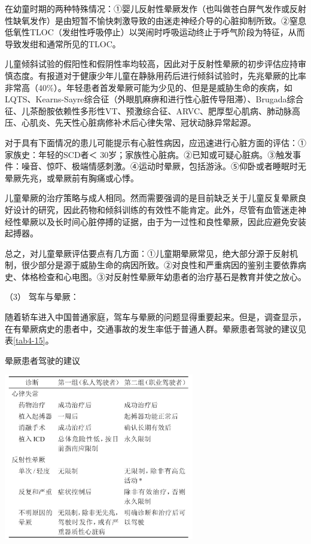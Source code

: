 在幼童时期的两种特殊情况：①婴儿反射性晕厥发作（也叫做苍白屏气发作或反射性缺氧发作）是由短暂不愉快刺激导致的由迷走神经介导的心脏抑制所致。②窒息低氧性TLOC（发绀性呼吸停止）以哭闹时呼吸运动终止于呼气阶段为特征，从而导致发绀和通常所见的TLOC。

儿童倾斜试验的假阳性和假阴性率均较高，因此对于反射性晕厥的初步评估应持审慎态度。有报道对于健康少年儿童在静脉用药后进行倾斜试验时，先兆晕厥的比率非常高（40\%）。年轻患者首发晕厥可能为少见的、但是是威胁生命的疾病，如LQTS、Kearns-Sayre综合征（外眼肌麻痹和进行性心脏传导阻滞）、Brugada综合征、儿茶酚胺依赖性多形性VT、预激综合征、ARVC、肥厚型心肌病、肺动脉高压、心肌炎、先天性心脏病修补术后心律失常、冠状动脉异常起源。

对于具有下面情况的患儿可能提示有心脏性病因，应迅速进行心脏方面的评估：①家族史：年轻的SCD者＜
30岁；家族性心脏病。②已知或可疑心脏病。③触发事件：噪音、惊吓、极端情感刺激。④运动时晕厥，包括游泳。⑤仰卧或者睡眠时无晕厥先兆，或晕厥前有胸痛或心悸。

儿童晕厥的治疗策略与成人相同。然而需要强调的是目前缺乏关于儿童反复晕厥良好设计的研究，因此药物和倾斜训练的有效性不能肯定。此外，尽管有血管迷走神经性晕厥以及长时间心脏停搏的证据，由于为一过性和良性晕厥，因此应避免安装起搏器。

总之，对儿童晕厥评估要点有几方面：①儿童期晕厥常见，绝大部分源于反射机制，很少部分是源于威胁生命的病因所致。②对良性和严重病因的鉴别主要依靠病史、体格检查和心电图。③对反射性晕厥年幼患者的治疗基石是教育并使之放心。

\hypertarget{text00014.htmlux5cux23CHP1-4-4-1-5-3}{}
（3） 驾车与晕厥：

随着轿车进入中国普通家庭，驾车与晕厥的问题显得重要起来。但是，调查显示，在有晕厥病史的患者中，交通事故的发生率低于普通人群。晕厥患者驾驶的建议见表\ref{tab4-15}。

\begin{table}[htbp]
\centering
\caption{晕厥患者驾驶的建议}
\label{tab4-15}
\includegraphics[width=3.27083in,height=2.86458in]{./images/Image00033.jpg}
\end{table}

